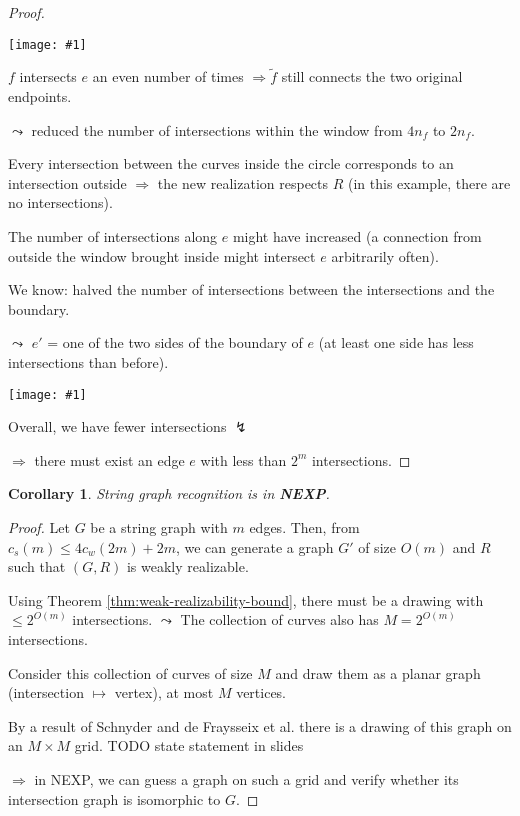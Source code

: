 \documentclass[12pt]{article}
\theoremstyle{plain} %
\newtheorem{corollary}[theorem]{Corollary}
\newcommand{\image}[1]{\begin{center}\texttt{[image: \#1]}\end{center}}
\begin{document}
\begin{proof}
\image{images/figure-9.pdf}

\(f\) intersects \(e\) an even number of times \(\Rightarrow \tilde{f}\) still connects the two original endpoints.

\(\leadsto\) reduced the number of intersections within the window from \(4 n_f\) 
to \(2 n_f\).

Every intersection between the curves inside the circle corresponds to an intersection 
outside \(\Rightarrow\) the new realization respects \(R\) (in this example, there are no intersections).

The number of intersections along \(e\) might have increased (a connection from outside the window brought inside might intersect \(e\) arbitrarily often).

We know: halved the number of intersections between the intersections and the boundary. 

\(\leadsto\) \(e'\) = one of the two sides of the boundary of \(e\)
(at least one side has less intersections than before).

\image{images/figure-10.pdf}

Overall, we have fewer intersections \(\lightning\)

\(\Rightarrow\) there must exist an edge \(e\) with less than \(2^m\) intersections.
\end{proof}

\begin{corollary}
    String graph recognition is in \textbf{NEXP}.
\end{corollary}

\begin{proof}
Let \(G\) be a string graph with \(m\) edges. 
Then, from \(c_s(m) \leq 4 c_w(2m) + 2m\), we can generate a graph \(G'\) of size \(O(m)\) and \(R\) such that 
\((G, R)\) is weakly realizable. 

Using Theorem \ref{thm:weak-realizability-bound}, there must be a drawing with \(\leq 2^{O(m)}\) intersections.
\(\leadsto\) The collection of curves also has \(M = 2^{O(m)}\) intersections.

Consider this collection of curves of size \(M\) and draw them as a planar graph (intersection \(\mapsto\) vertex), 
at most \(M\) vertices.

By a result of Schnyder and de Fraysseix et al. there is a drawing of this graph on an \(M \times M\) grid.
TODO state statement in slides

\(\Rightarrow\) in NEXP, we can guess a graph on such a grid and verify whether its intersection graph is isomorphic to \(G\).
\end{proof}
\end{document}

